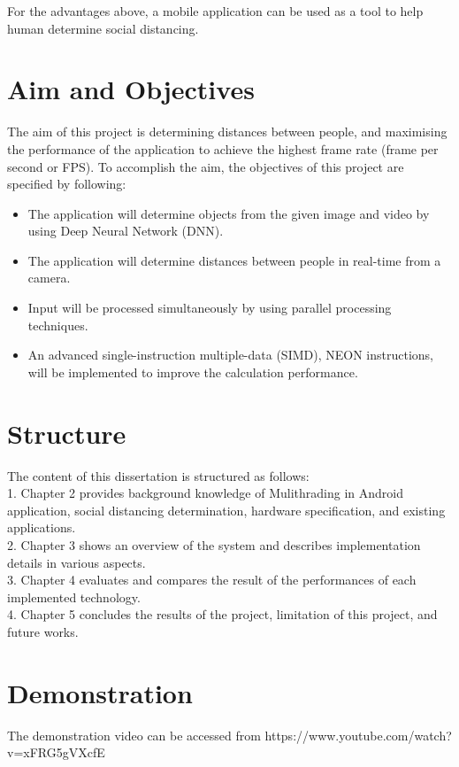         For the advantages above, a mobile application can be used as a tool to help human determine social distancing.

    \section{Aim and Objectives}
        The aim of this project is determining distances between people,
        and maximising the performance of the application to achieve the highest frame rate (frame per second or FPS).
        To accomplish the aim, the objectives of this project are specified by following:
        \begin{itemize}
            \setlength\itemsep{1em}
            \item The application will determine objects from the given image and video by using Deep Neural Network (DNN).
            \item The application will determine distances between people in real-time from a camera.
            \item Input will be processed simultaneously by using parallel processing techniques.
            \item An advanced single-instruction multiple-data (SIMD), NEON instructions, will be implemented to improve the calculation performance.
        \end{itemize}

    \section{Structure}
        The content of this dissertation is structured as follows: \\
        1.  Chapter 2 provides background knowledge of Mulithrading in Android application,
            social distancing determination, hardware specification, and existing applications. \\
        2.  Chapter 3 shows an overview of the system and describes implementation details in various aspects.  \\
        3.  Chapter 4 evaluates and compares the result of the performances of each implemented technology. \\
        4.  Chapter 5 concludes the results of the project, limitation of this project, and future works.  \\

    \section{Demonstration}
    The demonstration video can be accessed from https://www.youtube.com/watch?v=xFRG5gVXcfE